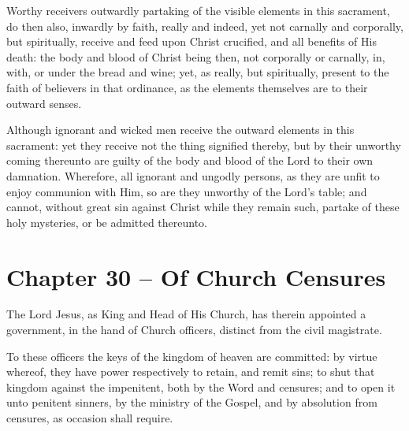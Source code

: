 \begin{outerlst}[left=0pt,labelsep=0pt]
\begin{innerlst}[resume*]
\item Worthy receivers outwardly partaking of the visible elements in this sacrament, do then also, inwardly by faith, really and indeed, yet not carnally and corporally, but spiritually, receive and feed upon Christ crucified, and all benefits of His death: the body and blood of Christ being then, not corporally or carnally, in, with, or under the bread and wine; yet, as really, but spiritually, present to the faith of believers in that ordinance, as the elements themselves are to their outward senses.   

\item Although ignorant and wicked men receive the outward elements in this sacrament: yet they receive not the thing signified thereby, but by their unworthy coming thereunto are guilty of the body and blood of the Lord to their own damnation. Wherefore, all ignorant and ungodly persons, as they are unfit to enjoy communion with Him, so are they unworthy of the Lord's table; and cannot, without great sin against Christ while they remain such, partake of these holy mysteries, or be admitted thereunto.  
\end{innerlst}

\item
{}
\section{Chapter 30 -- Of Church Censures}
\begin{innerlst}[resume*]

\item The Lord Jesus, as King and Head of His Church, has therein appointed a government, in the hand of Church officers, distinct from the civil magistrate.   

\item To these officers the keys of the kingdom of heaven are committed: by virtue whereof, they have power respectively to retain, and remit sins; to shut that kingdom against the impenitent, both by the Word and censures; and to open it unto penitent sinners, by the ministry of the Gospel, and by absolution from censures, as occasion shall require.   


\end{innerlst}
\end{outerlst}
